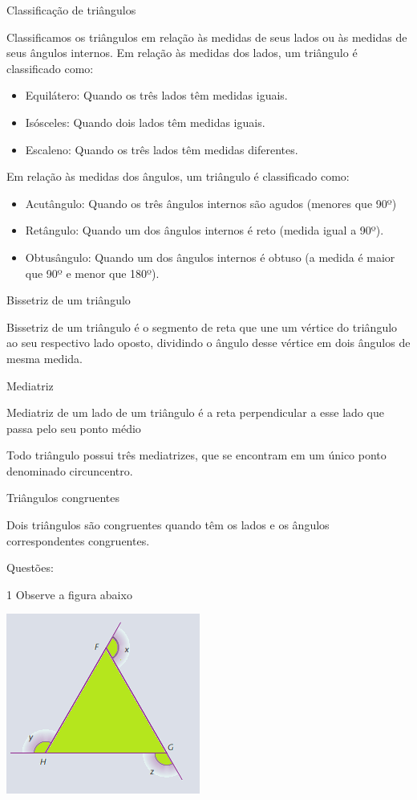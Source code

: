 Classificação de triângulos

Classificamos os triângulos em relação às medidas de seus lados ou às
medidas de seus ângulos internos. Em relação às medidas dos lados, um
triângulo é classificado como:

\begin{itemize}

\item 
  Equilátero: Quando os três lados têm medidas iguais.

\item 
  Isósceles: Quando dois lados têm medidas iguais.

\item 
  Escaleno: Quando os três lados têm medidas diferentes.
\end{itemize}

Em relação às medidas dos ângulos, um triângulo é classificado como:

\begin{itemize}

\item 
  Acutângulo: Quando os três ângulos internos são agudos (menores que
  90º)

\item 
  Retângulo: Quando um dos ângulos internos é reto (medida igual a 90º).

\item 
  Obtusângulo: Quando um dos ângulos internos é obtuso (a medida é maior
  que 90º e menor que 180º).
\end{itemize}

Bissetriz de um triângulo

Bissetriz de um triângulo é o segmento de reta que une um vértice do
triângulo ao seu respectivo lado oposto, dividindo o ângulo desse
vértice em dois ângulos de mesma medida.

Mediatriz

Mediatriz de um lado de um triângulo é a reta perpendicular a esse lado
que passa pelo seu ponto médio

Todo triângulo possui três mediatrizes, que se encontram em um único
ponto denominado circuncentro.

Triângulos congruentes

Dois triângulos são congruentes quando têm os lados e os ângulos
correspondentes congruentes.

Questões:

\num{1} Observe a figura abaixo

\includegraphics[width=1\times 88333in,height=1\times 75048in]{./imgSAEB_8_MAT/media/image13.png}

